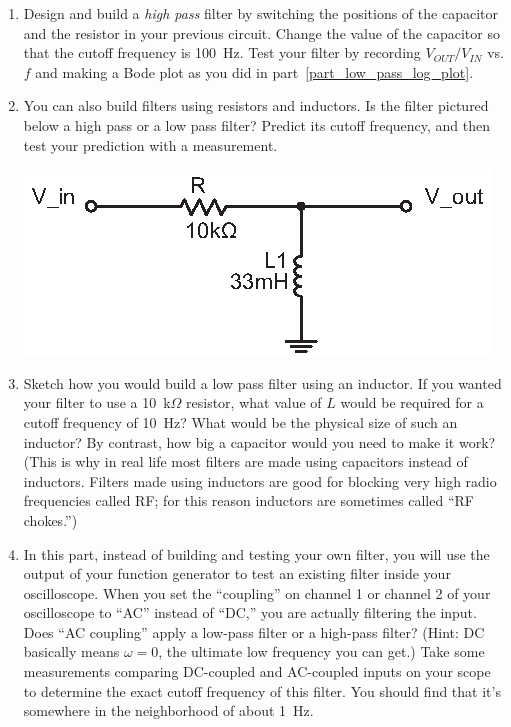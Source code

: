 \begin{enumerate}[wide]
\item Design and build a \textit{high pass} filter by switching the positions of the capacitor and the resistor in your previous circuit.  Change the value of the capacitor so that the cutoff frequency is 100~Hz.  Test your filter by recording $V_{OUT}/V_{IN}$ vs. $f$ and making a Bode plot as you did in part~\ref{part_low_pass_log_plot}.  \label{part_high_pass_RC}

\item You can also build filters using resistors and inductors.  Is the filter pictured below a high pass or a low pass filter?  Predict its cutoff frequency, and then test your prediction with a measurement. \label{part_high_pass_RL}
\begin{center}
\includegraphics{filters/high_pass_filter_LR.eps}
\end{center}

\item Sketch how you would build a low pass filter using an inductor.  If you wanted your filter to use a 10~k$\Omega$ resistor, what value of $L$ would be required for a cutoff frequency of 10~Hz?  What would be the physical size of such an inductor?  By contrast, how big a capacitor would you need to make it work?  (This is why in real life most filters are made using capacitors instead of inductors.  Filters made using inductors are good for blocking very high radio frequencies called RF; for this reason inductors are sometimes called ``RF chokes.'')  \label{part_low_pass_RL}

\item In this part, instead of building and testing your own filter, you will use the output of your function generator to test an existing filter inside your oscilloscope.  When you set the ``coupling'' on channel 1 or channel 2 of your oscilloscope to ``AC'' instead of ``DC,'' you are actually filtering the input.  Does ``AC coupling'' apply a low-pass filter or a high-pass filter?  (Hint: DC basically means $\omega=0$, the ultimate low frequency you can get.) Take some measurements comparing DC-coupled and AC-coupled inputs on your scope to determine the exact cutoff frequency of this filter.  You should find that it's somewhere in the neighborhood of about 1~Hz.


\end{enumerate}
